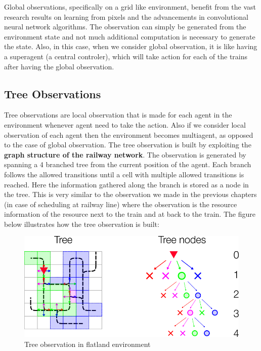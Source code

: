 Global observations, specifically on a grid like environment, benefit from the vast research results 
on learning from pixels and the advancements in convolutional neural network algorithms. 
The observation can simply be generated from the environment state and not much additional 
computation is necessary to generate the state.
Also, in this case, when we consider global observation, it is like having a superagent (a 
central controler), which will take action for each of the trains after having the global 
observation.

\subsection{Tree Observations}
Tree observations are local observation that is made for each agent in the environment whenever agent
need to take the action. Also if we consider local observation of each agent then the environment becomes
multiagent, as opposed to the case of global observation.
The tree observation is built by exploiting the \textbf{graph structure of the railway network}. 
The observation is generated by spanning a 4 branched tree from the current position of the agent. 
Each branch follows the allowed transitions until a cell with multiple allowed transitions is reached. 
Here the information gathered along the branch is stored as a node in the tree. This is 
very similar to the observation we made in the previous chapters (in case of scheduling at railway line)
 where the observation is 
the resource information of the resource next to the train and at back to the train.
The figure below illustrates how the tree observation is built:

\begin{figure}[h]
    \centering
    \includegraphics[width=1.0\textwidth]{flatland2}
    \caption{ Tree observation in flatland environment \cite{WEBSITE:8}}
    \label{image-myimage2}
\end{figure}

